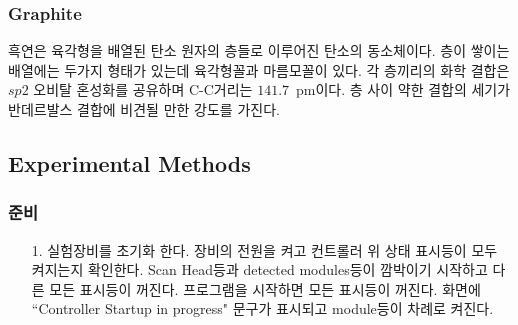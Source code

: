 \documentclass[aps,reprint,superscriptaddress,11pt]{revtex4-2}
\begin{document}
\subsubsection{Graphite}
흑연은 육각형을 배열된 탄소 원자의 층들로 이루어진 탄소의 동소체이다. 층이 쌓이는 배열에는
두가지 형태가 있는데 육각형꼴과 마름모꼴이 있다. 각 층끼리의 화학 결합은 $sp2$ 오비탈 혼성화를
공유하며 C-C거리는 $141.7$~pm이다. 층 사이 약한 결합의 세기가 반데르발스 결합에 비견될 만한
강도를 가진다.
\subsection{Experimental Methods}
\subsubsection{준비}
\begin{itemize}
  \item[1. ] 실험장비를 초기화 한다. 장비의 전원을 켜고 컨트롤러 위 상태 표시등이 모두 켜지는지
  확인한다. Scan Head등과 detected modules등이 깜박이기 시작하고 다른 모든 표시등이 꺼진다.
  프로그램을 시작하면 모든 표시등이 꺼진다. 화면에 “Controller Startup in 
  progress" 문구가 표시되고 module등이 차례로 켜진다. 
  

\end{itemize}
\end{document}
